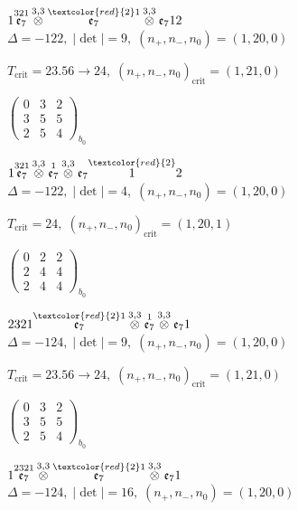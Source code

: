 \documentclass[10pt]{article}
\begin{document}
$1\overset{321}{\mathfrak{e}_7}\overset{3,3}{\otimes}\overset{\textcolor{red}{2}1}{\mathfrak{e}_7}\overset{3,3}{\otimes}\mathfrak{e}_712$ \quad $\Delta=-122,\; |\det|=9,\; (n_+,n_-,n_0)=(1,20,0)$

\hspace{1em}$T_{\text{crit}}=23.56 \to 24,\; (n_+,n_-,n_0)_{\text{crit}}=(1,21,0)$

\hspace{2em}$\left(\begin{smallmatrix}0 & 3 & 2 \\ 3 & 5 & 5 \\ 2 & 5 & 4\end{smallmatrix}\right)_{\!b_0}$

$1\overset{321}{\mathfrak{e}_7}\overset{3,3}{\otimes}\overset{1}{\mathfrak{e}_7}\overset{3,3}{\otimes}\mathfrak{e}_7\overset{\textcolor{red}{2}}{1}2$ \quad $\Delta=-122,\; |\det|=4,\; (n_+,n_-,n_0)=(1,20,0)$

\hspace{1em}$T_{\text{crit}}=24,\; (n_+,n_-,n_0)_{\text{crit}}=(1,20,1)$

\hspace{2em}$\left(\begin{smallmatrix}0 & 2 & 2 \\ 2 & 4 & 4 \\ 2 & 4 & 4\end{smallmatrix}\right)_{\!b_0}$

\smallskip

$2321\overset{\textcolor{red}{2}1}{\mathfrak{e}_7}\overset{3,3}{\otimes}\overset{1}{\mathfrak{e}_7}\overset{3,3}{\otimes}\mathfrak{e}_71$ \quad $\Delta=-124,\; |\det|=9,\; (n_+,n_-,n_0)=(1,20,0)$

\hspace{1em}$T_{\text{crit}}=23.56 \to 24,\; (n_+,n_-,n_0)_{\text{crit}}=(1,21,0)$

\hspace{2em}$\left(\begin{smallmatrix}0 & 3 & 2 \\ 3 & 5 & 5 \\ 2 & 5 & 4\end{smallmatrix}\right)_{\!b_0}$

$1\overset{2321}{\mathfrak{e}_7}\overset{3,3}{\otimes}\overset{\textcolor{red}{2}1}{\mathfrak{e}_7}\overset{3,3}{\otimes}\mathfrak{e}_71$ \quad $\Delta=-124,\; |\det|=16,\; (n_+,n_-,n_0)=(1,20,0)$
\end{document}
